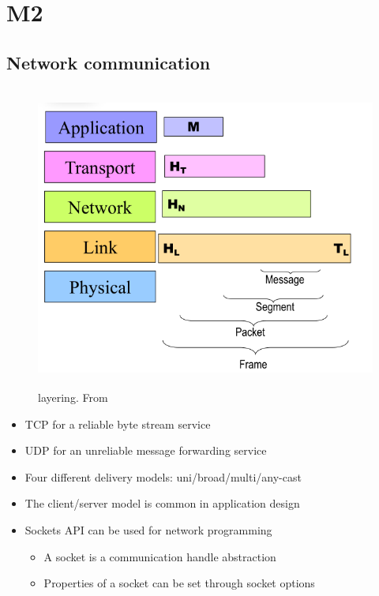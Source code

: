 \section{M2}
\subsection{Network communication}
\begin{figure}[h]
    \vspace{10mm}
    \centering
    \includegraphics[width=14cm, height=10cm]{image/layering.png}
    \caption{layering. From \cite{}}
\end{figure}

\begin{itemize}
\item TCP for a reliable byte stream service
\item UDP for an unreliable message forwarding service
\item Four different delivery models: uni/broad/multi/any-cast
\item The client/server model is common in application design
\item Sockets API can be used for network programming
  \begin{itemize}
  \item A socket is a communication handle abstraction
  \item Properties of a socket can be set through socket options
  \end{itemize}
\end{itemize}

